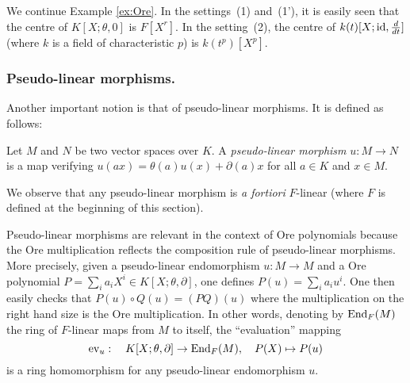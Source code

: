 \documentclass[a4paper]{llncs}
\newcommand{\id}{\textrm{\rm id}}
\newcommand{\End}{\textrm{\rm End}}
\newcommand{\ev}[1]{\textrm{\rm ev}_{#1}}
\begin{document}
{\small
\begin{example}
\label{ex:centre}
We continue Example \ref{ex:Ore}. In the settings~(1) and~(1'), it is 
easily seen that the centre of $K[X;\theta,0]$ is $F[X^r]$.
In the setting~(2), the centre of $k(t)[X; \id, \frac d{dt}]$ (where
$k$ is a field of characteristic $p$) is $k(t^p)[X^p]$. 
%
\end{example}}

\subsubsection*{Pseudo-linear morphisms.}

Another important notion is that of pseudo-linear morphisms. It is 
defined as follows:

\begin{definition}
Let $M$ and $N$ be two vector spaces over $K$.
A \emph{pseudo-linear morphism} $u : M\to N$ is a map verifying 
$u(ax) = \theta(a)u(x) + \partial(a)x$ for all $a \in K$ and $x \in M$.
\end{definition}

We observe that any pseudo-linear morphism is \emph{a fortiori}
$F$-linear (where $F$ is defined at the beginning of this section).

Pseudo-linear morphisms are relevant in the context of Ore polynomials 
because the Ore multiplication reflects the composition rule of 
pseudo-linear morphisms. More precisely, given a pseudo-linear 
endomorphism $u : M \to M$ and a Ore polynomial $P = \sum_i a_i X^i \in 
K[X;\theta,\partial]$, one defines $P(u) = \sum_i a_i u^i$. One then 
easily checks that $P(u) \circ Q(u) = (PQ)(u)$ where the multiplication 
on the right hand size is the Ore multiplication. In other words, 
denoting by $\End_F(M)$ the ring of $F$-linear maps from $M$ to itself, 
the ``evaluation'' mapping
$$\ev{u} : \quad K[X;\theta,\partial] \to \End_F(M), \quad
P(X) \mapsto P(u)$$
is a ring homomorphism for any pseudo-linear endomorphism $u$.
\end{document}
